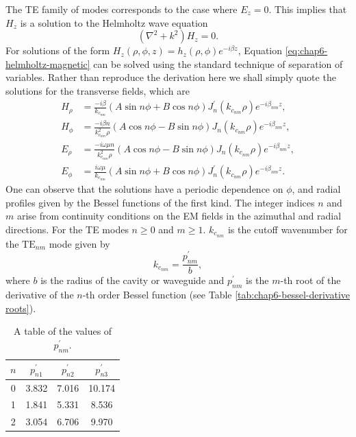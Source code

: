 The TE family of modes corresponds to the case where $E_z=0$. This implies that $H_z$ is a solution to the Helmholtz wave equation 
\begin{equation}
    (\nabla^2 + k^2)H_z = 0.
    \label{eq:chap6-helmholtz-magnetic}
\end{equation}
For solutions of the form $H_z(\rho,\phi,z)=h_z(\rho,\phi)e^{-i\beta z}$, Equation \ref{eq:chap6-helmholtz-magnetic} can be solved using the standard technique of separation of variables. Rather than reproduce the derivation here we shall simply quote the solutions for the transverse fields, which are 
\begin{align}
    H_\rho &= \frac{-i\beta }{k_{c_{nm}}}(A\sin{n\phi}+B\cos{n\phi})J_n^\prime(k_{c_{nm}}\rho)e^{-i\beta_{nm} z},\\
    H_\phi &=\frac{-i\beta n}{k_{c_{nm}}^2\rho}(A\cos{n\phi}-B\sin{n\phi})J_n(k_{c_{nm}}\rho)e^{-i\beta_{nm} z},\\
    E_\rho &=\frac{-i\omega\mu n}{k_{c_{nm}}^2 \rho}(A\cos{n\phi}-B\sin{n\phi})J_n(k_{c_{nm}}\rho)e^{-i\beta_{nm} z},\\
    E_\phi &=\frac{i\omega\mu}{k_{c_{nm}}}(A\sin{n\phi}+B\cos{n\phi})J_n^\prime(k_{c_{nm}}\rho)e^{-i\beta_{nm} z}.
\end{align}
One can observe that the solutions have a periodic dependence on $\phi$, and radial profiles given by the Bessel functions of the first kind. The integer indices $n$ and $m$ arise from continuity conditions on the EM fields in the azimuthal and radial directions. For the TE modes $n\geq0$ and $m\geq1$. $k_{c_{nm}}$ is the cutoff wavenumber for the $\mathrm{TE}_{nm}$ mode given by 
\begin{equation}
    k_{c_{nm}} = \frac{p^\prime_{nm}}{b},
\end{equation}
where $b$ is the radius of the cavity or waveguide and $p^\prime_{nm}$ is the $m$-th root of the derivative of the $n$-th order Bessel function (see Table \ref{tab:chap6-bessel-derivative roots}).

\begin{table}[htbp]
    \centering
    \caption{\label{tab:chap6-bessel-derivative-roots} A table of the values of $p_{nm}^\prime$.}
    \begin{tabular}{c c c c }
        \hline
        $n$ & $p_{n1}^\prime$ & $p_{n2}^\prime$ & $p_{n3}^\prime$ \\
        \hline
        0 & 3.832 & 7.016 & 10.174\\
        1 & 1.841 & 5.331 & 8.536\\
        2 & 3.054 & 6.706 & 9.970\\
        \hline
    \end{tabular}
\end{table}

